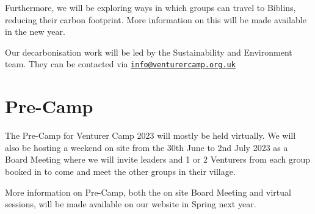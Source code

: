 \documentclass[a4paper, 10pt]{report}
\begin{document}
Furthermore, we will be exploring ways in which groups can travel to Biblins, reducing their carbon footprint. More information on this will be made available in the new year.

Our decarbonisation work will be led by the Sustainability and Environment team. They can be contacted via \href{mailto:info@venturercamp.org.uk}{\texttt{info@venturercamp.org.uk}}

\chapter{Pre-Camp}
The Pre-Camp for Venturer Camp 2023 will mostly be held virtually. We will also be hosting a weekend on site from the 30th June to 2nd July 2023 as a Board Meeting where we will invite leaders and 1 or 2 Venturers from each group booked in to come and meet the other groups in their village.

More information on Pre-Camp, both the on site Board Meeting and virtual sessions, will be made available on our website in Spring next year. 

\backPage
\end{document}
